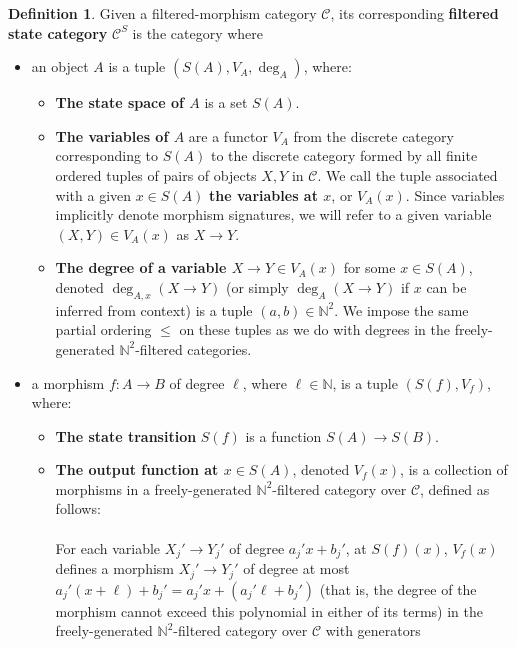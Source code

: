 \documentclass{article}
\theoremstyle{definition}
\newtheorem{definition}{Definition}[section]
\theoremstyle{remark}
\begin{document}
\begin{definition}
\label{def:filteredstatecategory} Given a filtered-morphism category
$\mathcal{C}$, its corresponding
\textbf{filtered state category} $\mathcal{C}^S$ is the category where
\begin{itemize}
    \item an object $A$ is a tuple $(S(A), V_A, \deg_A)$, where:
    \begin{itemize}
    \item \textbf{The state space of $A$} is a set $S(A)$.
    \item \textbf{The variables of $A$} are a functor $V_A$ from the
    discrete category corresponding to $S(A)$ to the discrete category
    formed by all finite ordered tuples of pairs of objects
    $X,Y$ in $\mathcal{C}$. We call the tuple associated with a given $x \in
    S(A)$ \textbf{the variables at $x$}, or $V_A(x)$. Since variables
    implicitly denote morphism signatures, we will refer to a given
    variable $(X,Y) \in V_A(x)$ as $X\to Y$. 
    \item \textbf{The degree of a variable $X\to Y \in V_A(x)$} for some
    $x \in S(A)$, denoted $\deg_{A,x}(X \to Y)$ (or simply
    $\deg_{A}(X\to Y)$ if $x$ can be inferred from context) is a 
    tuple $(a,b) \in \mathbb{N}^2$. We impose the same partial ordering
    $\leq$
    on these tuples as we do with degrees in the freely-generated
    $\mathbb{N}^2$-filtered categories.
\end{itemize}
    \item a morphism $f:A \to B$ of degree $\ell$, where
    $\ell \in \mathbb{N}$, is a tuple
    $(S(f),V_f)$, where:
    \begin{itemize}
        \item \textbf{The state transition} $S(f)$ is a function
        $S(A) \to S(B)$.
        \item \textbf{The output function at $x \in S(A)$},
        denoted $V_f(x)$, is a collection of morphisms in a
        freely-generated $\mathbb{N}^2$-filtered category over
        $\mathcal{C}$, defined as follows:
        \\ \\
        For each variable $X_j'\to Y_j'$ of degree $a_j'x+b_j'$, at
        $S(f)(x)$,
        $V_f(x)$ defines a morphism $X_j'\to Y_j'$ of degree
        at most $a_j'(x+\ell)+b_j'=a_j'x+(a_j'\ell+b_j')$ (that is,
        the degree of the morphism cannot exceed this polynomial in either
        of its terms)
        in the freely-generated
        $\mathbb{N}^2$-filtered category over $\mathcal{C}$ with generators

\end{itemize}
\end{itemize}
\end{definition}
\end{document}
